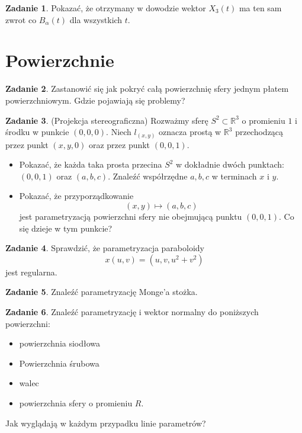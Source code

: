 \documentclass[a4paper,11pt]{article}
\theoremstyle{definition}\newtheorem{exercise}{Zadanie}
\theoremstyle{definition}\newtheorem{remark}{Uwaga}
\begin{document}
\begin{exercise}
Pokazać, że otrzymany w dowodzie wektor $X_3(t)$ ma ten sam zwrot co 
$B_\alpha(t)$ dla wszystkich $t$.
\end{exercise}



\section{Powierzchnie}

\begin{exercise}
Zastanowić się jak pokryć całą powierzchnię sfery jednym płatem 
powierzchniowym. Gdzie pojawiają się problemy?
\end{exercise}

\begin{exercise}(Projekcja stereograficzna)
 Rozważmy sferę $S^2\subset \mathbb{R}^3$ o promieniu $1$ i środku w punkcie 
$(0,0,0)$. Niech 
$l_{(x,y)}$ oznacza prostą w $\mathbb{R}^3$ przechodzącą przez punkt $(x,y,0)$ 
oraz przez punkt $(0,0,1)$. 
\begin{itemize}
 \item Pokazać, że każda taka prosta przecina $S^2$ w dokładnie dw\'och 
punktach: $(0,0,1)$ oraz $(a,b,c)$. Znaleźć wsp\'ołrzędne $a,b,c$ w terminach 
$x$ i $y$.
\item Pokazać, że przyporządkowanie
\[(x,y)\mapsto (a,b,c)\]
jest parametryzacją powierzchni sfery nie obejmującą punktu $(0,0,1)$. Co się 
dzieje w tym punkcie?
\end{itemize}
\end{exercise}


\begin{exercise}
Sprawdzić, że parametryzacja paraboloidy
\[x(u,v)=(u,v,u^2+v^2)\] jest regularna.
\end{exercise}

\begin{exercise}
Znaleźć parametryzację Monge'a stożka. 
\end{exercise}

\begin{exercise}
 Znaleźć parametryzację i wektor normalny do poniższych powierzchni:
 \begin{itemize}
  \item powierzchnia siodłowa
  \item Powierzchnia śrubowa 
  \item walec
  \item powierzchnia sfery o promieniu $R$.
 \end{itemize}
 Jak wyglądają w każdym przypadku linie parametr\'ow?
\end{exercise}
\end{document}
